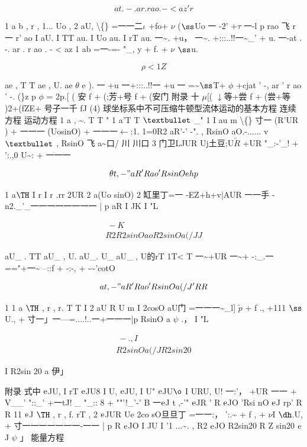 \[at . -. ar . r ao . - < az' r\]

1 a b , r , 1... Uo , 2 aU, \textbackslash\{\} =一一二$\iota$ +fo+ $\nu$ (${\rm ß}$Uo 一 -2' +$\tau$ 一-l p rao 飞 r 一 r' ao I aU. I TT au. I Uo au. I rT au. 一\textasciitilde{}. +u， 一\textasciitilde{}. +:::..!!一\textasciitilde{}\_' + u. 一-at . -. ar . r ao . - < az 1 ab =一-=- "\_, y + f. + $\nu$ ${\rm ß}$u.

\[\rho  <1 Z\]

ae , T T ae , U. ae $\theta$ e ). 一 +u 一+:::..!!一 +u 一 =\textasciitilde{}${\rm ß}$T+ $\phi$ +cjat ' -, ar ' r ao ' -. (\}z p $\phi$ = 2p.[ ( 安 f + (;芳+号 f + (安门 附录 十 $\mu$[( $\downarrow$等+尝 f + (尝+等 )2+(fZE+ 号子一千 fJ (4) 球坐标系中不可压缩牛顿型流体运动的基本方程 连续方程 运动方程 1 a , \textasciitilde{}. T T " 1 a'T T ${\rm •}$ \_" 1 I au m \textbackslash\{\} 寸一 (R'UR ) + 一一一 (UosinO) + 一一一$\leftarrow$:1. 1=0R2 aR'-' -". , RsinO aO.-...... v ${\rm •}$ , RsinO 飞 a\textasciitilde{}口/ 川 川口 3 门卫LJUR Uj土豆;U$\tilde{R}$ +UR "\_:-'\_! + ':.,0 U\textasciitilde{}: + 一一一

\[\theta  t ,-" aR ' R ao 'R sinO ehp\]

1 a${\rm Þ}$ I r I r .rr 2UR 2 a(Uo sinO) 2 缸里丁=一 -EZ+h+v|AUR 一一手 - n2.\_'\_一一一一一一一一 | p aR I JK I "L

\begin{gather*}
~-K\\
R 2 R2sinO ao R2sinO a(/J J
\end{gather*}

aU\_ . TT aU\_ , U. aU\_. U\_ aU\_ , U的rT 1T< T 一\textasciitilde{}+UR 一\textasciitilde{}+ -:\_.一=="+一\textasciitilde{} --::f + -:-, + -\textasciitilde{}'cotO

\[at ,-" aR ' R ao 'RsinO a(/J' R R\]

1 1 a ${\rm Þ}$ , r , r. T T I 2 aU R U m I 2cosO aU门 =一一一\textasciitilde{}\_l] $\tilde{p}$ + f ., +111 ${\rm ß}$U., + 寸一」一---=....!..一+一一一|p RsinO a $\psi$ .， I "L

\begin{gather*}
~-.,  I\\
R2sinO a(/J R2sin 20
\end{gather*}

I R2sin 20 a 伊」

附录 式中 ${\rm e}$JU, I rT ${\rm e}$JU8 I U, ${\rm e}$JU, I U" ${\rm e}$JU${\rm ø}$ I URU, U! 一:'， +UR 一一 + V\_\_' "::\_' +一tJ! \_ "\_:: 8 + ""'!\_'-' B 一${\rm e}$J t ,-'" ${\rm e}$JR ' R ${\rm e}$JO 'Rsi nO ${\rm e}$J rp' R R 11 ${\rm e}$J ${\rm Þ}$ , r , f. rT , 2 ${\rm e}$JUR Ue 2co sO旦旦丁 =一一:， ':.\textasciitilde{} + f , + $\nu$I ${\rm ð}$.U, + 寸一一一一一一一-一一 | p R ${\rm e}$JO I JU I '1 ...\textasciitilde{}. , R2 ${\rm e}$JO R2sin20 R Z sin20 ${\rm e}$J $\psi$ 」 能量方程

